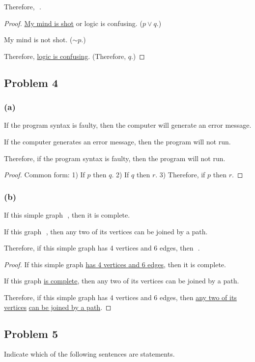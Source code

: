 \documentclass[14pt]{extarticle}
\newcommand{\fbl}{\underline{\hspace{1cm}}\,\,}
\begin{document}
Therefore, \fbl.

\begin{proof}
\underline{My mind is shot} or logic is confusing. ($p \vee q$.)

My mind is not shot. ($\sim p$.)

Therefore, \underline{logic is confusing}. (Therefore, $q$.)
\end{proof}

\subsection{Problem 4}
\subsubsection{(a)}
If the program syntax is faulty, then the computer will generate an error message.

If the computer generates an error message, then the program will not run.

Therefore, if the program syntax is faulty, then the program will not run.

\begin{proof}
Common form: 1) If $p$ then $q$. 2) If $q$ then $r$. 3) Therefore, if $p$ then $r$.
\end{proof}

\subsubsection{(b)}
If this simple graph \fbl, then it is complete.

If this graph \fbl, then any two of its vertices can be joined by a path.

Therefore, if this simple graph has 4 vertices and 6 edges, then \fbl.

\begin{proof}
If this simple graph \underline{has 4 vertices and 6 edges}, then it is complete.

If this graph \underline{is complete}, then any two of its vertices can be joined by a path.

Therefore, if this simple graph has 4 vertices and 6 edges, then
\underline{any two of its vertices} \underline{can be joined by a path}.
\end{proof}

\subsection{Problem 5}
Indicate which of the following sentences are statements.
\end{document}
